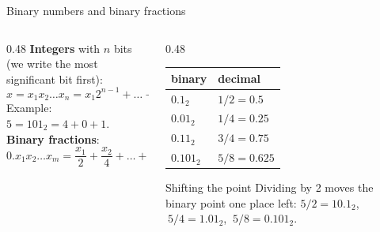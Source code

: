 \documentclass[aspectratio=169,11pt]{beamer}
\newcommand{\key}[1]{{\color{qdark}\textbf{#1}}}
\begin{document}
\begin{frame}{Binary numbers and binary fractions}
  \begin{columns}[T]
    \begin{column}{0.48\textwidth}
      \key{Integers} with $n$ bits (we write the most significant bit first):
      \[ x = x_1x_2\dots x_n = x_1 2^{n-1} + \dots + x_n 2^0 \]
      Example: $5 = 101_2 = 4 + 0 + 1$.\\[3mm]
      \key{Binary fractions}:
      \[ 0.x_1x_2\dots x_m = \frac{x_1}{2} + \frac{x_2}{4} + \dots + \frac{x_m}{2^m} \]
    \end{column}
    \begin{column}{0.48\textwidth}
      \begin{tabular}{ll}
        \toprule
        binary & decimal\\
        \midrule
        $0.1_2$ & $1/2 = 0.5$\\
        $0.01_2$ & $1/4 = 0.25$\\
        $0.11_2$ & $3/4 = 0.75$\\
        $0.101_2$ & $5/8 = 0.625$\\
        \bottomrule
      \end{tabular}
      \vspace{2mm}
      \begin{block}{Shifting the point}
        Dividing by 2 moves the binary point one place left:
        $5/2 = 10.1_2$, $\ 5/4 = 1.01_2$, $\ 5/8 = 0.101_2$.
      \end{block}
    \end{column}
  \end{columns}
\end{frame}

\end{document}
